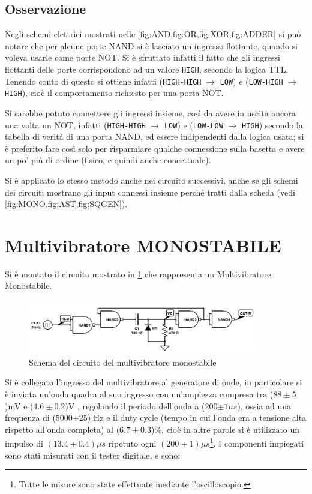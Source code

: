 \documentclass[a4paper,10pt]{article}
\def\code#1{\texttt{#1}}
\begin{document}
\subsection{Osservazione} Negli schemi elettrici mostrati nelle \cref{fig:AND,fig:OR,fig:XOR,fig:ADDER} si può notare che per alcune porte NAND si è lasciato un ingresso flottante, quando si voleva usarle come porte NOT. Si è sfruttato infatti il fatto che gli ingressi flottanti delle porte corrispondono ad un valore \code{HIGH}, secondo la logica TTL.
Tenendo conto di questo si ottiene infatti (\code{HIGH-HIGH} $\rightarrow$ \code{LOW}) e (\code{LOW-HIGH} $\rightarrow$ \code{HIGH}), cioè il comportamento richiesto per una porta NOT.

Si sarebbe potuto connettere gli ingressi insieme, così da avere in uscita ancora una volta un NOT, infatti (\code{HIGH-HIGH} $\rightarrow$ \code{LOW}) e (\code{LOW-LOW} $\rightarrow$ \code{HIGH}) secondo la tabella di verità di una porta NAND, ed essere indipendenti dalla logica usata; si è preferito fare così solo per risparmiare qualche connessione sulla basetta e avere un po' più di ordine (fisico, e quindi anche concettuale).

Si è applicato lo stesso metodo anche nei circuito successivi, anche se gli schemi dei circuiti mostrano gli input connessi insieme perché tratti dalla scheda (vedi \cref{fig:MONO,fig:AST,fig:SQGEN}).


\section{Multivibratore MONOSTABILE}
Si è montato il circuito mostrato in \cref{fig:MONO} che rappresenta un Multivibratore Monostabile. 


\begin{figure}[H]
	\centering
	\includegraphics[width=0.9\textwidth]{../grafici/Monostabile.png}
	\caption{Schema del circuito del multivibratore monostabile}
	\label{fig:MONO}
\end{figure}


Si è collegato l'ingresso del multivibratore al generatore di onde, in particolare si è inviata un'onda quadra al suo ingresso con un'ampiezza compresa tra ($88\pm5$)mV e ($4.6\pm0.2$)V , regolando il periodo dell'onda a (200$\pm 1 \mu s$), ossia ad una frequenza di (5000$\pm$25) Hz e il duty cycle (tempo in cui l'onda era a tensione alta rispetto all'onda completa) al ($6.7\pm0.3$)\%, cioè in altre parole si è utilizzato un impulso di $(13.4\pm0.4) \mu s$ ripetuto ogni $(200\pm1) \mu s$\footnote{Tutte le misure sono state effettuate mediante l'oscilloscopio.}.
\newline
\newline
I componenti impiegati sono stati misurati con il tester digitale, e sono:
\end{document}
